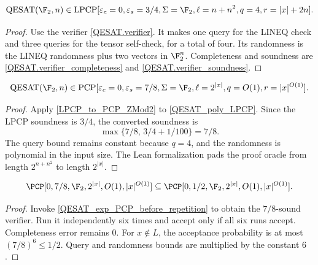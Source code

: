 \begin{theorem}
\label{QESAT_poly_LPCP}
\leanok
\[
  \mathrm{QESAT}(\F_2,n) \in
  \mathrm{LPCP}[
    \varepsilon_c = 0,
    \varepsilon_s = 3/4,
    \Sigma = \F_2,
    \ell = n + n^2,
    q = 4,
    r = |x| + 2n
  ].
\]
\end{theorem}
\begin{proof}\leanok
Use the verifier \ref{QESAT.verifier}. It makes one query for the LINEQ check
and three queries for the tensor self-check, for a total of four. Its
randomness is the LINEQ randomness plus two vectors in \(\F_2^n\). Completeness
and soundness are \ref{QESAT.verifier_completeness} and
\ref{QESAT.verifier_soundness}.
\end{proof}

\begin{theorem}
\label{QESAT_exp_PCP_before_repetition}
\leanok
\[
  \mathrm{QESAT}(\F_2,n) \in
  \mathrm{PCP}[
    \varepsilon_c = 0,
    \varepsilon_s = 7/8,
    \Sigma = \F_2,
    \ell = 2^{|x|},
    q = O(1),
    r = |x|^{O(1)}
  ].
\]
\end{theorem}
\begin{proof}\leanok
Apply \ref{LPCP_to_PCP_ZMod2} to \ref{QESAT_poly_LPCP}. Since the LPCP
soundness is \(3/4\), the converted soundness is
\[
  \max\{7/8,\,3/4+1/100\}=7/8.
\]
The query bound remains constant because \(q=4\), and the randomness is
polynomial in the input size. The Lean formalization pads the proof oracle from
length \(2^{n+n^2}\) to length \(2^{|x|}\).
\end{proof}

\begin{lemma}
\label{QESAT.constant_repetition}
\leanok
\[\PCP[0,7/8,\F_2,2^{|x|},O(1),|x|^{O(1)}] \subseteq \PCP[0,1/2,\F_2,2^{|x|},O(1),|x|^{O(1)}].\]
\end{lemma}
\begin{proof}\leanok
Invoke \ref{QESAT_exp_PCP_before_repetition} to obtain the \(7/8\)-sound
verifier. Run it independently six times and accept only if all six runs
accept. Completeness error remains \(0\). For \(x\notin L\), the acceptance
probability is at most \((7/8)^6\leq 1/2\). Query and randomness bounds are
multiplied by the constant \(6\).
\end{proof}

